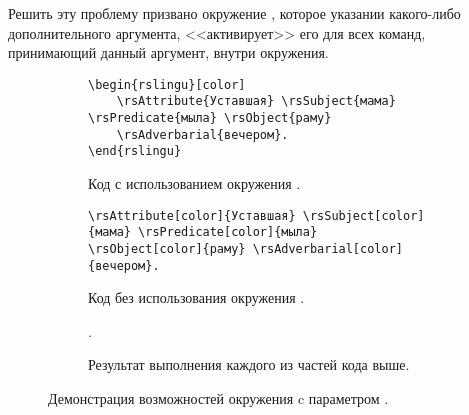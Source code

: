 Решить эту проблему призвано окружение , которое указании какого-либо дополнительного аргумента, <<активирует>> его для всех команд, принимающий данный аргумент, внутри окружения.
\begin{figure}[htp!]
    \centering
    \begin{subfigure}{\textwidth}
        \begin{verbatim}
\begin{rslingu}[color]
    \rsAttribute{Уставшая} \rsSubject{мама} \rsPredicate{мыла} \rsObject{раму}
    \rsAdverbarial{вечером}.
\end{rslingu}
        \end{verbatim}
    \caption{Код с использованием окружения .}
    \end{subfigure}\vspace*{.75cm}
    \begin{subfigure}{\textwidth}
        \begin{verbatim}
\rsAttribute[color]{Уставшая} \rsSubject[color]{мама} \rsPredicate[color]{мыла}
\rsObject[color]{раму} \rsAdverbarial[color]{вечером}.
        \end{verbatim}
    \caption{Код без использования окружения .}
    \end{subfigure}\vspace*{.75cm}
    \begin{subfigure}{.9\textwidth}
        \centering
        \begin{rslingu}[color]
                .
        \end{rslingu}
    \caption{Результат выполнения каждого из частей кода выше.}
    \end{subfigure}
    \caption{Демонстрация возможностей окружения  c параметром .}
\end{figure}



